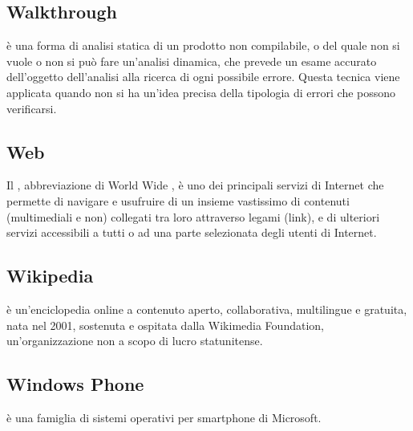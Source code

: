 \subsection{Walkthrough }
 è una forma di analisi statica di un prodotto non compilabile, o del
quale non si vuole o non si può fare un'analisi dinamica, che prevede un esame accurato
dell'oggetto dell'analisi alla ricerca di ogni possibile errore. Questa tecnica viene applicata
quando non si ha un'idea precisa della tipologia di errori che possono verificarsi.

\subsection{Web}
Il , abbreviazione di World Wide , è uno dei principali servizi di Internet che permette di navigare e usufruire di un insieme vastissimo di contenuti (multimediali e non) collegati tra loro attraverso legami (link), e di ulteriori servizi accessibili a tutti o ad una parte selezionata degli utenti di Internet.

\subsection{Wikipedia}
 è un'enciclopedia online a contenuto aperto, collaborativa, multilingue e gratuita, nata nel 2001, sostenuta e ospitata dalla Wikimedia Foundation, un'organizzazione non a scopo di lucro statunitense.

\subsection{Windows Phone}
 è una famiglia di sistemi operativi per smartphone di Microsoft.

